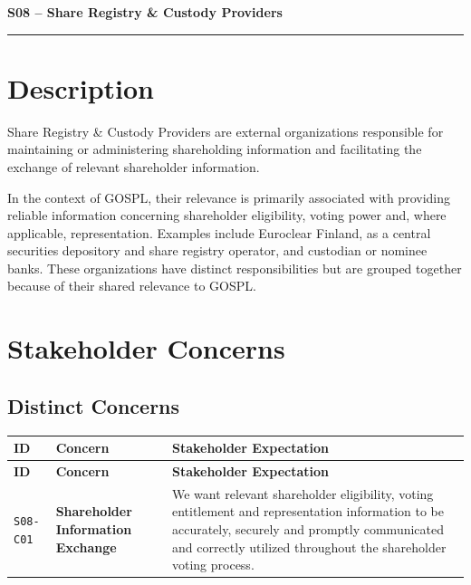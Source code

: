 \documentclass[11pt,a4paper]{article}
\begin{document}

{\LARGE\bfseries S08 -- Share Registry \& Custody Providers\par}\vspace{1em}
\noindent\rule{\linewidth}{0.4pt}

\section*{Description}

Share Registry \& Custody Providers are external organizations responsible for maintaining or administering shareholding information and facilitating the exchange of relevant shareholder information.

In the context of GOSPL, their relevance is primarily associated with providing reliable information concerning shareholder eligibility, voting power and, where applicable, representation. Examples include Euroclear Finland, as a central securities depository and share registry operator, and custodian or nominee banks. These organizations have distinct responsibilities but are grouped together because of their shared relevance to GOSPL.

\section*{Stakeholder Concerns}

\subsection*{Distinct Concerns}

\begingroup\small
\begin{longtable}{@{}>{\raggedright\arraybackslash}p{}>{\raggedright\arraybackslash}p{}>{\raggedright\arraybackslash}p{}@{}}
\toprule
\textbf{ID} & \textbf{Concern} & \textbf{Stakeholder Expectation} \\
\midrule
\endfirsthead
\toprule
\textbf{ID} & \textbf{Concern} & \textbf{Stakeholder Expectation} \\
\midrule
\endhead
\bottomrule
\endfoot
\texttt{S08-C01} & \textbf{Shareholder Information Exchange} & We want relevant shareholder eligibility, voting entitlement and representation information to be accurately, securely and promptly communicated and correctly utilized throughout the shareholder voting process. \\
\end{longtable}
\endgroup
\end{document}
